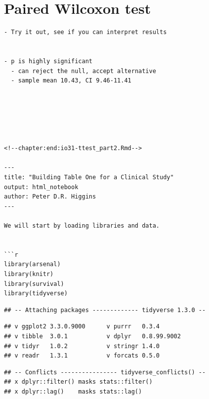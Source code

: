 \documentclass[
]{book}
\newenvironment{Shaded}{\begin{snugshade}}{\end{snugshade}}
\newcommand{\CommentTok}[1]{\textcolor[rgb]{0.56,0.35,0.01}{\textit{#1}}}
\newcommand{\DataTypeTok}[1]{\textcolor[rgb]{0.13,0.29,0.53}{#1}}
\newcommand{\KeywordTok}[1]{\textcolor[rgb]{0.13,0.29,0.53}{\textbf{#1}}}
\newcommand{\NormalTok}[1]{#1}
\newcommand{\OperatorTok}[1]{\textcolor[rgb]{0.81,0.36,0.00}{\textbf{#1}}}
\newcommand{\OtherTok}[1]{\textcolor[rgb]{0.56,0.35,0.01}{#1}}
\newcommand{\StringTok}[1]{\textcolor[rgb]{0.31,0.60,0.02}{#1}}
\begin{document}
\hypertarget{paired-wilcoxon-test}{%
\section{Paired Wilcoxon test}\label{paired-wilcoxon-test}}

\begin{Shaded}
\end{Shaded}

\begin{verbatim}
- Try it out, see if you can interpret results


- p is highly significant
  - can reject the null, accept alternative
  - sample mean 10.43, CI 9.46-11.41






<!--chapter:end:io31-ttest_part2.Rmd-->

---
title: "Building Table One for a Clinical Study"
output: html_notebook
author: Peter D.R. Higgins
---

We will start by loading libraries and data.


```r
library(arsenal)
library(knitr)
library(survival)
library(tidyverse)
\end{verbatim}

\begin{verbatim}
## -- Attaching packages ------------- tidyverse 1.3.0 --
\end{verbatim}

\begin{verbatim}
## v ggplot2 3.3.0.9000      v purrr   0.3.4      
## v tibble  3.0.1           v dplyr   0.8.99.9002
## v tidyr   1.0.2           v stringr 1.4.0      
## v readr   1.3.1           v forcats 0.5.0
\end{verbatim}

\begin{verbatim}
## -- Conflicts ---------------- tidyverse_conflicts() --
## x dplyr::filter() masks stats::filter()
## x dplyr::lag()    masks stats::lag()
\end{verbatim}
\end{document}
